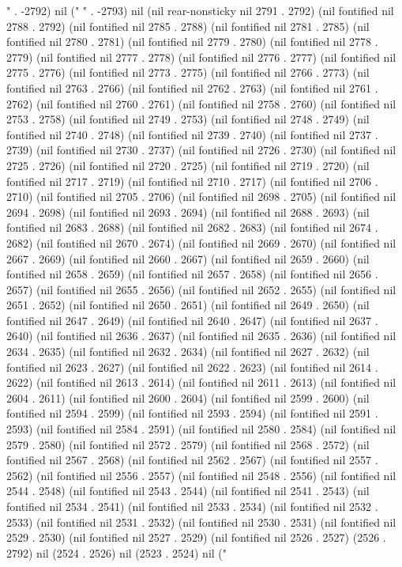 " . -2792) nil (" " . -2793) nil (nil rear-nonsticky nil 2791 . 2792) (nil fontified nil 2788 . 2792) (nil fontified nil 2785 . 2788) (nil fontified nil 2781 . 2785) (nil fontified nil 2780 . 2781) (nil fontified nil 2779 . 2780) (nil fontified nil 2778 . 2779) (nil fontified nil 2777 . 2778) (nil fontified nil 2776 . 2777) (nil fontified nil 2775 . 2776) (nil fontified nil 2773 . 2775) (nil fontified nil 2766 . 2773) (nil fontified nil 2763 . 2766) (nil fontified nil 2762 . 2763) (nil fontified nil 2761 . 2762) (nil fontified nil 2760 . 2761) (nil fontified nil 2758 . 2760) (nil fontified nil 2753 . 2758) (nil fontified nil 2749 . 2753) (nil fontified nil 2748 . 2749) (nil fontified nil 2740 . 2748) (nil fontified nil 2739 . 2740) (nil fontified nil 2737 . 2739) (nil fontified nil 2730 . 2737) (nil fontified nil 2726 . 2730) (nil fontified nil 2725 . 2726) (nil fontified nil 2720 . 2725) (nil fontified nil 2719 . 2720) (nil fontified nil 2717 . 2719) (nil fontified nil 2710 . 2717) (nil fontified nil 2706 . 2710) (nil fontified nil 2705 . 2706) (nil fontified nil 2698 . 2705) (nil fontified nil 2694 . 2698) (nil fontified nil 2693 . 2694) (nil fontified nil 2688 . 2693) (nil fontified nil 2683 . 2688) (nil fontified nil 2682 . 2683) (nil fontified nil 2674 . 2682) (nil fontified nil 2670 . 2674) (nil fontified nil 2669 . 2670) (nil fontified nil 2667 . 2669) (nil fontified nil 2660 . 2667) (nil fontified nil 2659 . 2660) (nil fontified nil 2658 . 2659) (nil fontified nil 2657 . 2658) (nil fontified nil 2656 . 2657) (nil fontified nil 2655 . 2656) (nil fontified nil 2652 . 2655) (nil fontified nil 2651 . 2652) (nil fontified nil 2650 . 2651) (nil fontified nil 2649 . 2650) (nil fontified nil 2647 . 2649) (nil fontified nil 2640 . 2647) (nil fontified nil 2637 . 2640) (nil fontified nil 2636 . 2637) (nil fontified nil 2635 . 2636) (nil fontified nil 2634 . 2635) (nil fontified nil 2632 . 2634) (nil fontified nil 2627 . 2632) (nil fontified nil 2623 . 2627) (nil fontified nil 2622 . 2623) (nil fontified nil 2614 . 2622) (nil fontified nil 2613 . 2614) (nil fontified nil 2611 . 2613) (nil fontified nil 2604 . 2611) (nil fontified nil 2600 . 2604) (nil fontified nil 2599 . 2600) (nil fontified nil 2594 . 2599) (nil fontified nil 2593 . 2594) (nil fontified nil 2591 . 2593) (nil fontified nil 2584 . 2591) (nil fontified nil 2580 . 2584) (nil fontified nil 2579 . 2580) (nil fontified nil 2572 . 2579) (nil fontified nil 2568 . 2572) (nil fontified nil 2567 . 2568) (nil fontified nil 2562 . 2567) (nil fontified nil 2557 . 2562) (nil fontified nil 2556 . 2557) (nil fontified nil 2548 . 2556) (nil fontified nil 2544 . 2548) (nil fontified nil 2543 . 2544) (nil fontified nil 2541 . 2543) (nil fontified nil 2534 . 2541) (nil fontified nil 2533 . 2534) (nil fontified nil 2532 . 2533) (nil fontified nil 2531 . 2532) (nil fontified nil 2530 . 2531) (nil fontified nil 2529 . 2530) (nil fontified nil 2527 . 2529) (nil fontified nil 2526 . 2527) (2526 . 2792) nil (2524 . 2526) nil (2523 . 2524) nil ("
